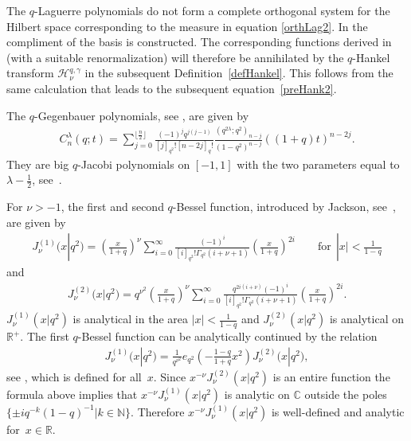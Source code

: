 \documentclass[11pt]{article}
\newcommand{\mR}{\mathbb{R}}
\newcommand{\mC}{\mathbb{C}}
\newcommand{\mN}{\mathbb{N}}
\newcommand{\cH}{\mathcal{H}}
\numberwithin{equation}{section}
\begin{document}
\begin{remark}
The $q$-Laguerre polynomials do not form a complete orthogonal system for the Hilbert space corresponding to the measure in equation \eqref{orthLag2}. In \cite{MR1803885} the compliment of the basis is constructed. The corresponding functions derived in~\cite[Section~4]{MR1803885} (with a suitable renormalization) will therefore be annihilated by the $q$-Hankel transform $\cH_\nu^{q,\gamma}$ in the subsequent Def\/inition~\ref{defHankel}. This follows from the same calculation that leads to the subsequent equation~\eqref{preHank2}.
\end{remark}

The $q$-Gegenbauer polynomials, see \cite[equation~(2.19)]{MR1340930}, are given by
\begin{gather}
\label{qGeg}
C^\lambda_n(q;t)=\sum_{j=0}^{\lfloor\frac{n}{2}\rfloor}\frac{(-1)^jq^{j(j-1)}}{[j]_{q^2}![n-2j]_q!}
\frac{(q^{2\lambda};q^2)_{n-j}}{(1-q^2)^{n-j}}((1+q)t)^{n-2j}.
\end{gather}
They are big $q$-Jacobi polynomials on $[-1,1]$ with the two parameters equal to $\lambda-\frac{1}{2}$, see~\cite[equation~(2.26)]{MR1340930}.

For $\nu>-1$, the f\/irst and second $q$-Bessel function, introduced by Jackson, see~\cite{MR0649849, JACKSON}, are given by
\begin{gather}
\label{Bessel1}
J_\nu^{(1)}\big(x|q^2\big)=\left(\frac{x}{1+q}\right)^\nu\sum_{i=0}^\infty\frac{(-1)^i}{[i]_{q^2}!
\Gamma_{q^2}(i+\nu+1)}\left(\frac{x}{1+q}\right)^{2i} \qquad \mbox{for} \ \ |x|<\frac{1}{1-q}
\end{gather}
and
\begin{gather}
\label{Bessel2}
J_\nu^{(2)}\big(x|q^2\big)=q^{\nu^2}\left(\frac{x}{1+q}\right)^\nu\sum_{i=0}^\infty\frac{q^{2i(i+\nu)}(-1)^i}{[i]_{q^2}!
\Gamma_{q^2}(i+\nu+1)}\left(\frac{x}{1+q}\right)^{2i}.
\end{gather}
$J_\nu^{(1)}(x|q^2)$ is analytical in the area $|x|<\frac{1}{1-q}$ and $J_\nu^{(2)}(x|q^2)$ is analytical on $\mR^+$.
The f\/irst $q$-Bessel function can be analytically continued by the relation
\begin{gather*}
J_\nu^{(1)}\big(x|q^2\big) = \frac{1}{q^{\nu^2}}e_{q^2}\left(-\frac{1-q}{1+q}x^2\right)J_{\nu}^{(2)}\big(x|q^2\big),
\end{gather*}
see \cite[Exercise~1.24]{MR1052153}, which is def\/ined for all~$x$. Since $x^{-\nu}J_\nu^{(2)}(x|q^2)$ is an entire function the formula above implies that $x^{-\nu}J_\nu^{(1)}(x|q^2)$ is analytic on $\mC$ outside the poles $\{\pm i q^{-k}(1-q)^{-1}|k\in\mN\}$. Therefore $x^{-\nu}J_\nu^{(1)}(x|q^2)$ is well-def\/ined and analytic for~$x\in\mR$.
\end{document}
